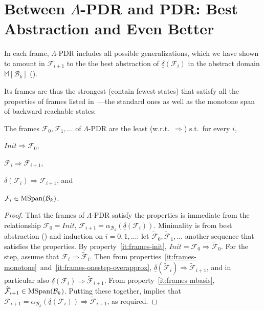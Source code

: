 \documentclass[acmsmall,screen]{acmart}
\newcommand{\toolong}[1]{#1}
\newcommand{\toolong}[1]{}
\renewcommand{\implies}{\Longrightarrow}
\newcommand{\Init}{{\textit{Init}}}
\newcommand{\tr}{\delta}
\newcommand{\Frame}{\mathcal{F}}
\newcommand{\reflextr}[1]{\underline{#1}}
\newcommand{\postimage}[2]{{\reflextr{#1}}({#2})}
\newcommand{\bkwrch}[1]{\mathcal{B}_{#1}}
\newcommand{\mspan}[1]{{\rm MSpan}({#1})}
\newcommand{\bkwspan}[1]{\mspan{\bkwrch{#1}}}
\newcommand{\malpha}[1]{\alpha_{#1}}
\newcommand{\madom}[1]{\mathbb{M}[{#1}]}
\begin{document}
%

%

%
 
%
\section{Between $\Lambda$-PDR and PDR: Best Abstraction and Even Better}
\label{sec:vs-pdr}
%
In each frame, $\Lambda$-PDR includes all possible generalizations, %
which we have shown to amount in $\Frame_{i+1}$ to the the best abstraction of $\postimage{\tr}{\Frame_i}$ in the abstract domain $\madom{\bkwrch{k}}$ ().
\begin{changebar}
Its frames are thus the strongest (contain fewest states) that satisfy all the properties of frames listed in~---the standard ones as well as the monotone span of backward reachable states:
\begin{lemma}
\label{lem:lambda-frames-minimality}
The frames $\Frame_0,\Frame_1,\ldots$ of $\Lambda$-PDR are the least (w.r.t.\ $\implies$) s.t.\ for every $i$,
\begin{inparaenum}
		\item $\Init \implies \Frame_0$,
		\item $\Frame_i \implies \Frame_{i+1}$,
		\item $\tr({\Frame_i}) \implies \Frame_{i+1}$, and
		\item $\Frame_i \in \bkwspan{k}$.
\end{inparaenum}
\end{lemma}
\toolong{
\begin{proof}
That the frames of $\Lambda$-PDR satisfy the properties is immediate from the relationship $\Frame_0 = \Init$, $\Frame_{i+1} = \malpha{\bkwrch{k}}(\postimage{\tr}{\Frame_i})$. Minimality is from best abstraction (\Cref{lem:best-abstraction}) and induction on $i=0,1,\ldots$: let $\widetilde{\Frame}_0,\widetilde{\Frame}_1,\ldots$ another sequence that satisfies the properties. By property~\ref{it:frames-init}, $\Init = \Frame_0 \implies \widetilde{\Frame}_0$. For the step, assume that $\Frame_i \implies \widetilde{\Frame}_i$. Then from properties~\ref{it:frames-monotone}~and~\ref{it:frames-onestep-overapprox}, $\postimage{\tr}{\widetilde{\Frame}_i} \implies \widetilde{\Frame}_{i+1}$, and in particular also $\postimage{\tr}{\Frame_i} \implies \widetilde{\Frame}_{i+1}$. From property~\ref{it:frames-mbasis}, $\widetilde{\Frame}_{i+1} \in \bkwspan{k}$. Putting these together, \Cref{lem:best-abstraction} implies that $\Frame_{i+1} = \malpha{\bkwrch{k}}(\postimage{\tr}{\Frame_i}) \implies \widetilde{\Frame}_{i+1}$, as required.

\end{proof}}
\end{changebar}
\end{document}
